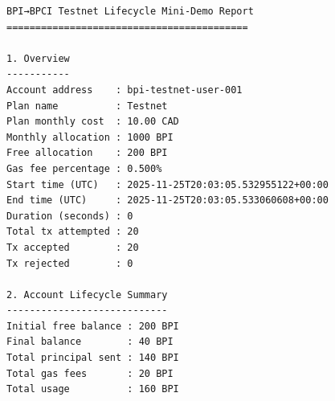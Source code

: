 \begin{lstlisting}[language=text]
BPI→BPCI Testnet Lifecycle Mini-Demo Report
==========================================

1. Overview
-----------
Account address    : bpi-testnet-user-001
Plan name          : Testnet
Plan monthly cost  : 10.00 CAD
Monthly allocation : 1000 BPI
Free allocation    : 200 BPI
Gas fee percentage : 0.500%
Start time (UTC)   : 2025-11-25T20:03:05.532955122+00:00
End time (UTC)     : 2025-11-25T20:03:05.533060608+00:00
Duration (seconds) : 0
Total tx attempted : 20
Tx accepted        : 20
Tx rejected        : 0

2. Account Lifecycle Summary
----------------------------
Initial free balance : 200 BPI
Final balance        : 40 BPI
Total principal sent : 140 BPI
Total gas fees       : 20 BPI
Total usage          : 160 BPI


\end{lstlisting}
